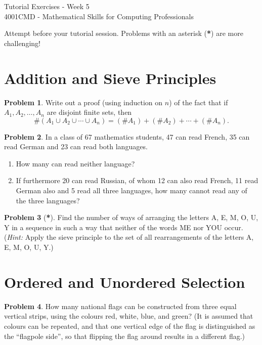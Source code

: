 \documentclass[12pt,a4paper]{article}
\numberwithin{equation}{section}
\theoremstyle{plain}
\theoremstyle{definition}
\newtheorem{problem}{Problem}
\begin{document}
\begin{center}
\Large{Tutorial Exercises - Week 5} \\
\vspace{3mm}
\large{4001CMD - Mathematical Skills for Computing Professionals} \\
\vspace{5mm}


{\scriptsize Attempt before your tutorial session. Problems with an asterisk (\textbf{*}) are more challenging!}
\end{center}


\section*{Addition and Sieve Principles}

\begin{problem}
	Write out a proof (using induction on $n$) of the fact that if $A_1, A_2, \ldots, A_n$ are disjoint finite sets, then \[
	\#\left(A_1 \cup A_2 \cup \cdots \cup A_n\right) = (\#A_1) + (\#A_2) + \cdots + (\#A_n).
	\]
\end{problem}

\begin{problem}
	In a class of 67 mathematics students, 47 can read French, 35 can read German and 23 can read both languages.
	\begin{enumerate}[label=(\alph*)]
		\item How many can read neither language? 
		\item If furthermore 20 can read Russian, of whom 12 can also read French, 11 read German also and 5 read all three languages, how many cannot read any of the three languages? 
	\end{enumerate}
\end{problem}

\begin{problem}[\textbf{*}]
	Find the number of ways of arranging the letters A, E, M, O, U, Y in a sequence in such a way that neither of the words ME nor YOU occur. (\emph{Hint:} Apply the sieve principle to the set of all rearrangements of the letters A, E, M, O, U, Y.)
\end{problem}

\section*{Ordered and Unordered Selection}

\begin{problem}
	How many national flags can be constructed from three equal vertical strips, using the colours red, white, blue, and green? (It is assumed that colours can be repeated, and that one vertical edge of the flag is distinguished as the ``flagpole side'', so that flipping the flag around results in a different flag.)
\end{problem}
\end{document}
